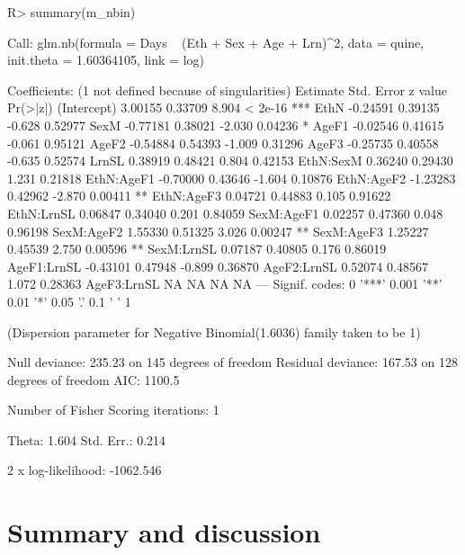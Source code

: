 \documentclass[article]{jss}
\begin{document}
\begin{Schunk}
\begin{Sinput}
R> summary(m_nbin)
\end{Sinput}
\begin{Soutput}
Call:
glm.nb(formula = Days ~ (Eth + Sex + Age + Lrn)^2, data = quine, 
    init.theta = 1.60364105, link = log)

Coefficients: (1 not defined because of singularities)
            Estimate Std. Error z value Pr(>|z|)    
(Intercept)  3.00155    0.33709   8.904  < 2e-16 ***
EthN        -0.24591    0.39135  -0.628  0.52977    
SexM        -0.77181    0.38021  -2.030  0.04236 *  
AgeF1       -0.02546    0.41615  -0.061  0.95121    
AgeF2       -0.54884    0.54393  -1.009  0.31296    
AgeF3       -0.25735    0.40558  -0.635  0.52574    
LrnSL        0.38919    0.48421   0.804  0.42153    
EthN:SexM    0.36240    0.29430   1.231  0.21818    
EthN:AgeF1  -0.70000    0.43646  -1.604  0.10876    
EthN:AgeF2  -1.23283    0.42962  -2.870  0.00411 ** 
EthN:AgeF3   0.04721    0.44883   0.105  0.91622    
EthN:LrnSL   0.06847    0.34040   0.201  0.84059    
SexM:AgeF1   0.02257    0.47360   0.048  0.96198    
SexM:AgeF2   1.55330    0.51325   3.026  0.00247 ** 
SexM:AgeF3   1.25227    0.45539   2.750  0.00596 ** 
SexM:LrnSL   0.07187    0.40805   0.176  0.86019    
AgeF1:LrnSL -0.43101    0.47948  -0.899  0.36870    
AgeF2:LrnSL  0.52074    0.48567   1.072  0.28363    
AgeF3:LrnSL       NA         NA      NA       NA    
---
Signif. codes:  0 '***' 0.001 '**' 0.01 '*' 0.05 '.' 0.1 ' ' 1

(Dispersion parameter for Negative Binomial(1.6036) family taken to be 1)

    Null deviance: 235.23  on 145  degrees of freedom
Residual deviance: 167.53  on 128  degrees of freedom
AIC: 1100.5

Number of Fisher Scoring iterations: 1


              Theta:  1.604 
          Std. Err.:  0.214 

 2 x log-likelihood:  -1062.546 
\end{Soutput}
\end{Schunk}




\section{Summary and discussion} \label{sec:summary}
\end{document}
